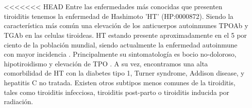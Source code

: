 \\ \\
<<<<<<< HEAD
\vspace{5mm}
Entre las enfermedades más conocidas que presenten tiroiditis tenemos la enfermedad de Hashimoto 'HT' (HP:0000872). Siendo la característica más común una elevación de los anticuerpos autoinmunes TPOAb y TGAb en las celulas tiroideas. HT estando presente aproximadamente en el 5 por ciento de la población mundial, siendo actualmente la enfermedad autoinmune con mayor incidencia \cite{Zheng2020}. Principalmente su sintomatología es bocio no-doloroso, hipotiroidismo y elevación de TPO \cite{Sweeney2014}. A su vez, encontramos una alta comorbilidad de HT con la diabetes tipo 1, Turner syndrome, Addison disease, y hepatitis C no tratada.\cite{Sweeney2014} 
Existen otros subtipos menos comunes de la tiroiditis, tales como tiroiditis infecciosa, tiroiditis post-parto o tiroiditis inducida por radiación. \cite{Sweeney2014}  
\vspace{20mm}

